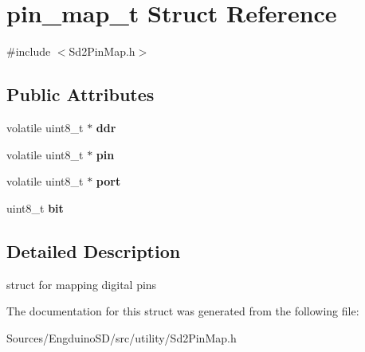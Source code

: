 \hypertarget{structpin__map__t}{\section{pin\+\_\+map\+\_\+t Struct Reference}
\label{structpin__map__t}
}


{\ttfamily \#include $<$Sd2\+Pin\+Map.\+h$>$}

\subsection*{Public Attributes}
\begin{DoxyCompactItemize}
\item 
\hypertarget{structpin__map__t_aa44a8430839786108c7c146bfd6cbda2}{volatile uint8\+\_\+t $\ast$ {\bfseries ddr}}\label{structpin__map__t_aa44a8430839786108c7c146bfd6cbda2}

\item 
\hypertarget{structpin__map__t_a42b51799010669a8ac2b964843afbfcf}{volatile uint8\+\_\+t $\ast$ {\bfseries pin}}\label{structpin__map__t_a42b51799010669a8ac2b964843afbfcf}

\item 
\hypertarget{structpin__map__t_a08f4c39a3cbb329c79b88f819dd7975f}{volatile uint8\+\_\+t $\ast$ {\bfseries port}}\label{structpin__map__t_a08f4c39a3cbb329c79b88f819dd7975f}

\item 
\hypertarget{structpin__map__t_a54decd1c6e4f618bc42fca722cf44934}{uint8\+\_\+t {\bfseries bit}}\label{structpin__map__t_a54decd1c6e4f618bc42fca722cf44934}

\end{DoxyCompactItemize}


\subsection{Detailed Description}
struct for mapping digital pins 

The documentation for this struct was generated from the following file\+:\begin{DoxyCompactItemize}
\item 
Sources/\+Engduino\+S\+D/src/utility/Sd2\+Pin\+Map.\+h\end{DoxyCompactItemize}
